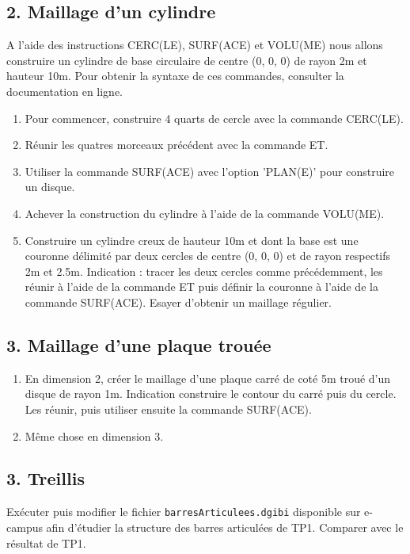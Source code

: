 \documentclass[a4paper,multicol]{article}
\begin{document}
\subsection*{2. Maillage d'un cylindre}
 A l'aide des instructions CERC(LE), SURF(ACE) et VOLU(ME) nous allons construire un
cylindre de base circulaire de centre (0, 0, 0) de rayon 2m et hauteur 10m. Pour obtenir la
syntaxe de ces commandes, consulter la documentation en ligne.
\begin{enumerate}
\item Pour commencer, construire 4 quarts de cercle avec la commande CERC(LE).
\item  Réunir les quatres morceaux précédent avec la commande ET.
\item  Utiliser la commande SURF(ACE) avec l'option 'PLAN(E)' pour construire un disque.
\item  Achever la construction du cylindre à l'aide de la commande VOLU(ME).
\item  Construire un cylindre creux de hauteur 10m et dont la base est une couronne délimité
par deux cercles de centre (0, 0, 0) et de rayon respectifs 2m et 2.5m. Indication : tracer
les deux cercles comme précédemment, les réunir à l'aide de la commande ET puis définir
la couronne à l'aide de la commande SURF(ACE). Esayer d'obtenir un maillage régulier.
\end{enumerate}
\subsection*{3. Maillage d'une plaque trouée}
\begin{enumerate}
\item En dimension 2, créer le maillage d'une plaque carré de coté 5m troué d'un disque de
rayon 1m. Indication construire le contour du carré puis du cercle. Les réunir, puis
utiliser ensuite la commande SURF(ACE).
\item  Même chose en dimension 3.
\end{enumerate}

\subsection*{3. Treillis }
Exécuter puis modifier le fichier {\tt barresArticulees.dgibi}  disponible sur e-campus afin d'étudier la structure des barres articulées de TP1. Comparer avec le résultat de TP1.

\end{document}
